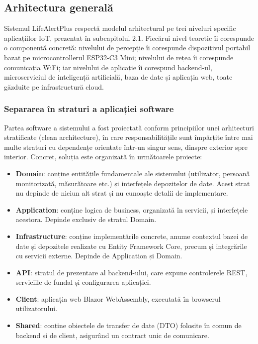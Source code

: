 \documentclass[12pt,a4paper,twoside]{article}
\begin{document}
\subsection{Arhitectura generală}

Sistemul LifeAlertPlus respectă modelul arhitectural pe trei niveluri specific aplicațiilor IoT, prezentat în subcapitolul 2.1. Fiecărui nivel teoretic îi corespunde o componentă concretă: nivelului de percepție îi corespunde dispozitivul portabil bazat pe microcontrollerul ESP32-C3 Mini; nivelului de rețea îi corespunde comunicația WiFi; iar nivelului de aplicație îi corespund backend-ul, microserviciul de inteligență artificială, baza de date și aplicația web, toate găzduite pe infrastructură cloud.

\subsubsection{Separarea în straturi a aplicației software}

Partea software a sistemului a fost proiectată conform principiilor unei arhitecturi stratificate (clean architecture), în care responsabilitățile sunt împărțite între mai multe straturi cu dependențe orientate într-un singur sens, dinspre exterior spre interior. Concret, soluția este organizată în următoarele proiecte:

\begin{itemize}[leftmargin=1.5em]
\item \textbf{Domain}: conține entitățile fundamentale ale sistemului (utilizator, persoană monitorizată, măsurătoare etc.) și interfețele depozitelor de date. Acest strat nu depinde de niciun alt strat și nu cunoaște detalii de implementare.
\item \textbf{Application}: conține logica de business, organizată în servicii, și interfețele acestora. Depinde exclusiv de stratul Domain.
\item \textbf{Infrastructure}: conține implementările concrete, anume contextul bazei de date și depozitele realizate cu Entity Framework Core, precum și integrările cu servicii externe. Depinde de Application și Domain.
\item \textbf{API}: stratul de prezentare al backend-ului, care expune controlerele REST, serviciile de fundal și configurarea aplicației.
\item \textbf{Client}: aplicația web Blazor WebAssembly, executată în browserul utilizatorului.
\item \textbf{Shared}: conține obiectele de transfer de date (DTO) folosite în comun de backend și de client, asigurând un contract unic de comunicare.
\end{itemize}
\end{document}
